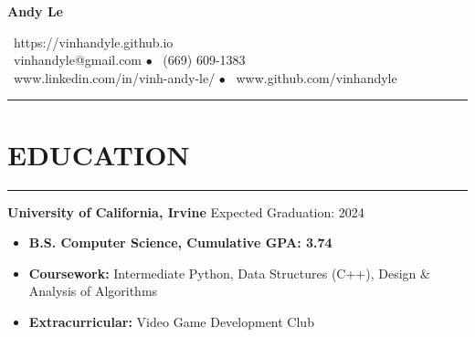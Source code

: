 \documentclass{article}
\begin{document}
   \begin{center}
      \Huge\textbf{Andy Le}\\
      \vspace{3pt}

      \normalsize{\faHome\ https://vinhandyle.github.io}\\

      \vspace{3pt}
      \normalsize{\faEnvelope\ vinhandyle@gmail.com} $\bullet$
      \normalsize{\faMobile\ (669) 609-1383} \\

      \vspace{3pt}
      \normalsize{\faLinkedinSquare\ www.linkedin.com/in/vinh-andy-le/} $\bullet$
      \normalsize{\faGithubSquare\ www.github.com/vinhandyle}
   \end{center}
\vspace{-5pt} \hrule \vspace{-5pt}

\section*{EDUCATION} \vspace{-6pt} \hrule \vspace{6pt}
\textbf{University of California, Irvine} \hfill Expected Graduation: 2024
\begin{itemize}
	\item\vspace{-6pt} \textbf{B.S. Computer Science, Cumulative GPA: 3.74}
	\item\vspace{-6pt}\textbf{Coursework:} Intermediate Python, Data Structures (C++), Design \& Analysis of Algorithms
	\item\vspace{-6pt}\textbf{Extracurricular:} Video Game Development Club
\end{itemize}
\vspace{-20pt}
\end{document}
